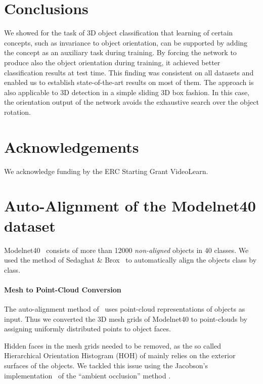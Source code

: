 \documentclass{bmvc2k}
\begin{document}
\section{Conclusions}
We showed for the task of 3D object classification that learning of certain concepts, such as invariance to object orientation, can be supported by adding the concept as an auxiliary task during training. By forcing the network to produce also the object orientation during training, it achieved better classification results at test time. This finding was consistent on all datasets and enabled us to establish state-of-the-art results on most of them. The approach is also applicable to 3D detection in a simple sliding 3D box fashion. In this case, the orientation output of the network avoids the exhaustive search over the object rotation. 

\section*{Acknowledgements}
We acknowledge funding by the ERC Starting Grant VideoLearn.


\clearpage

\vspace*{1cm}
\noindent{\LARGE\bfseries\sffamily\textcolor{bmv@sectioncolor}{Supplementary Material}}
\vspace*{2cm}


\section{Auto-Alignment of the Modelnet40 dataset}

Modelnet40~\cite{wu_3D_2015} consists of more than 12000 \textit{non-aligned} objects in 40 classes. We used the method of Sedaghat \& Brox~\cite{Sedaghat2015} to automatically align the objects class by class.

\paragraph{Mesh to Point-Cloud Conversion}
The auto-alignment method of~\cite{Sedaghat2015} uses point-cloud representations of objects as input. Thus we converted the 3D mesh grids of Modelnet40 to point-clouds by assigning uniformly distributed points to object faces. 


Hidden faces in the mesh grids needed to be removed, as the so called Hierarchical Orientation Histogram (HOH) of \cite{Sedaghat2015} mainly relies on the exterior surfaces of the objects. We tackled this issue using the Jacobson's implementation~\cite{gptoolbox} of the ``ambient occlusion'' method \cite{miller_efficient_1994}.
\end{document}

